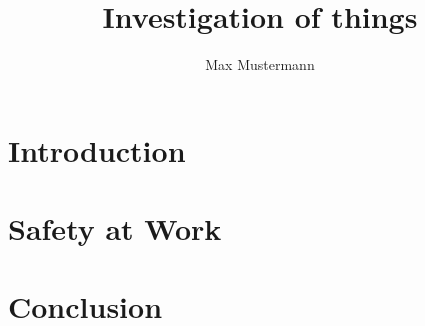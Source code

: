 





\makeatletter
\title{Investigation of things}
\author{Max Mustermann}
\makeatother

\renewcommand\floatpagefraction{.3} %






\tableofcontents




\chapter{Introduction} 


\chapter{Safety at Work}  
\label{ch:safety}



\chapter{Conclusion} 
\appendix
{} 
%

%

%

%

